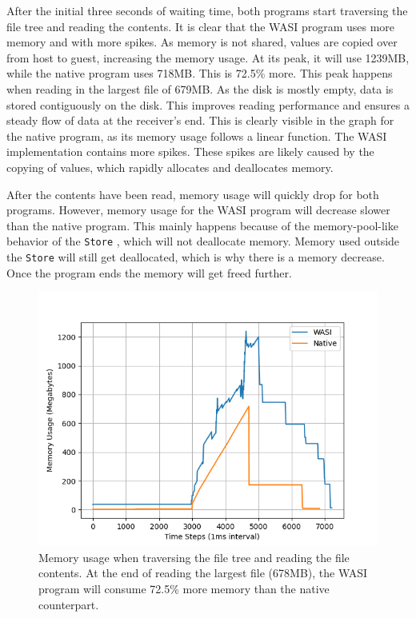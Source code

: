 After the initial three seconds of waiting time, both programs start traversing the file tree and reading the contents. It is clear that the \acrshort{WASI} program uses more memory and with more spikes. As memory is not shared, values are copied over from host to guest, increasing the memory usage. At its peak, it will use 1239MB, while the native program uses 718MB. This is 72.5\% more. This peak happens when reading in the largest file of 679MB. As the disk is mostly empty, data is stored contiguously on the disk. This improves reading performance and ensures a steady flow of data at the receiver's end. This is clearly visible in the graph for the native program, as its memory usage follows a linear function. The \acrshort{WASI} implementation contains more spikes. These spikes are likely caused by the copying of values, which rapidly allocates and deallocates memory.

After the contents have been read, memory usage will quickly drop for both programs. However, memory usage for the \acrshort{WASI} program will decrease slower than the native program. This mainly happens because of the memory-pool-like behavior of the \texttt{Store} \cite{wasmtime_store}, which will not deallocate memory. Memory used outside the \texttt{Store} will still get deallocated, which is why there is a memory decrease. Once the program ends the memory will get freed further.

\begin{figure}[H]
  \centering
  \includegraphics[width=1\textwidth]{images/mass_storage_comparison.png}
  \caption{Memory usage when traversing the file tree and reading the file contents. At the end of reading the largest file (678MB), the \acrshort{WASI} program will consume 72.5\% more memory than the native counterpart.}
  \label{fig:mass_storage_memory_comparison}
\end{figure}



